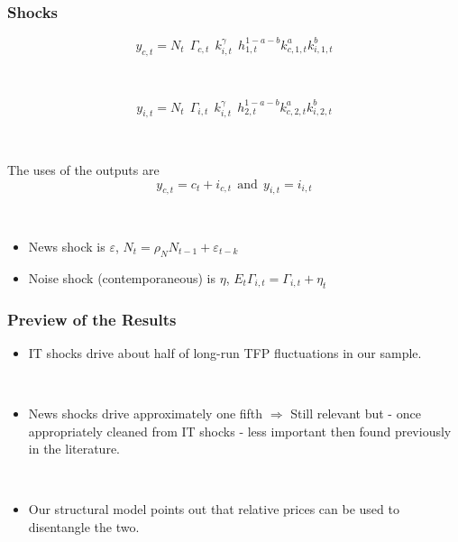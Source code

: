 \documentclass{beamer}
\begin{document}
\begin{frame}
	\frametitle{Shocks}
	

\begin{equation}\label{eq:prodfuncfinal}
y_{c,t} = N_t  \  \ \Gamma_{c,t}  \  \ k_{i,t}^{\gamma} \ \  h_{1,t}^{1 - a- b} k_{c,1,t}^a k_{i,1,t}^b
\end{equation}

\


\begin{equation}\label{eq:prodfuncinter}
y_{i,t} = N_t \ \ \Gamma_{i,t} \ \ k_{i,t}^{\gamma} \ \  h_{2,t}^{1 - a- b} k_{c,2,t}^a k_{i,2,t}^b
\end{equation}

\

The uses of the outputs are
$$
y_{c,t} = c_t + i_{c,t} \ \ \text{and} \ \ y_{i,t} = i_{i,t}
$$


\

\begin{itemize}
\item News shock is $\varepsilon$, $N_{t} = \rho_N N_{t-1} + \varepsilon_{t-k}$
\item Noise shock (contemporaneous) is $\eta$, $E_t \Gamma_{i,t} = \Gamma_{i,t} + \eta_t$
\end{itemize}

\end{frame}

\begin{frame}
\frametitle{Preview of the Results}

\begin{itemize}
	\item IT shocks drive about half of long-run TFP fluctuations in our sample. 
	
	\
	
	\item News shocks drive approximately one fifth $\Rightarrow$ Still relevant but - once appropriately cleaned from IT shocks - less important then found previously in the literature.
	 
	\
	
	
	\item Our structural model points out that relative prices can be used to disentangle the two. 
	
\end{itemize} 

\end{frame}
\end{document}
